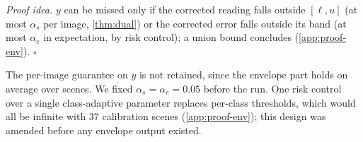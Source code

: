 \noindent\emph{Proof idea.} $y$ can be missed only if the corrected reading falls outside $[\ell,u]$ (at most $\alpha_s$ per image, \cref{thm:dual}) or the corrected error falls outside its band (at most $\alpha_e$ in expectation, by risk control); a union bound concludes (\cref{app:proof-env}). \hfill$\square$

\noindent The per-image guarantee on $y$ is not retained, since the envelope part holds on average over scenes.
We fixed $\alpha_s=\alpha_e=0.05$ before the run.
One risk control over a single class-adaptive parameter replaces per-class thresholds, which would all be infinite with 37 calibration scenes (\cref{app:proof-env}); this design was amended before any envelope output existed.

